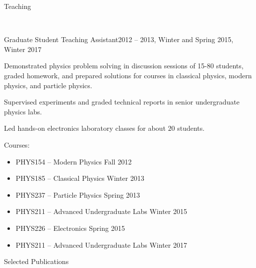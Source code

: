 \documentclass{resume}
\makeatletter
\newcommand\removebibheader
  {\xpatchcmd\std@thebibliography
    {\section*{\refname}%
     \@mkboth{\MakeUppercase\refname}{\MakeUppercase\refname}%
    }{}{}{}%
  }
\let\origsection\section%
\let\section\subsection%
\let\section\origsection%
\makeatother
\begin{document}
\begin{rsection}{Teaching}

  \\[0.5em]
  \begin{rsubsubsection}{Graduate Student Teaching Assistant}{2012 -- 2013, Winter and Spring 2015, Winter 2017}
  \item Demonstrated physics problem solving in discussion sessions of 15-80 students, graded homework, and prepared solutions for courses in classical physics, modern physics, and particle physics.
  \item Supervised experiments and graded technical reports in senior undergraduate physics labs.
  \item Led hands-on electronics laboratory classes for about $20$ students.
  \item Courses: \vspace{-0.1cm}
    \begin{itemize}
      \item PHYS154 -- Modern Physics \hfill Fall 2012 \vspace{-0.2cm}
      \item PHYS185 -- Classical Physics \hfill Winter 2013 \vspace{-0.2cm}
      \item PHYS237 -- Particle Physics \hfill Spring 2013 \vspace{-0.2cm}
      \item PHYS211 -- Advanced Undergraduate Labs \hfill Winter 2015 \vspace{-0.2cm}
      \item PHYS226 -- Electronics \hfill Spring 2015 \vspace{-0.2cm}
      \item PHYS211 -- Advanced Undergraduate Labs \hfill Winter 2017 \vspace{-0.2cm}
    \end{itemize}
  \end{rsubsubsection}

\end{rsection}

\newpage


\begin{rsection}{Selected Publications}
{\removebibheader
{}
}
\end{rsection}
\end{document}
